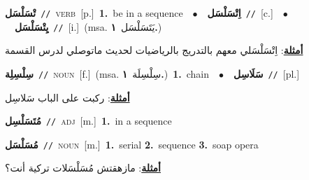 \documentclass[10pt,a4paper,twoside]{article} %
\begin{document}
\begin{multicols}{2}
{\setlength\topsep{0pt}\textbf{\foreignlanguage{arabic}{تْسَلْسَل}}\ {\color{gray}\texttt{//}\color{black}}\ \textsc{verb}\ [p.]\ \textbf{1.}~be in a sequence\ \ $\bullet$\ \ \setlength\topsep{0pt}\textbf{\foreignlanguage{arabic}{اِتْسَلْسَل}}\ {\color{gray}\texttt{//}\color{black}}\ [c.]\ \ $\bullet$\ \ \setlength\topsep{0pt}\textbf{\foreignlanguage{arabic}{يِتْسَلْسَل}}\ {\color{gray}\texttt{//}\color{black}}\ [i.]\ \color{gray}(msa. \foreignlanguage{arabic}{يَتَسَلْسَل}~\foreignlanguage{arabic}{\textbf{١.}})\color{black}\  \begin{flushright}\color{gray}\foreignlanguage{arabic}{\textbf{\underline{\foreignlanguage{arabic}{أمثلة}}}: اِتْسَلْسَلي معهم بالتدريج بالرياضيات لحديث ماتوصلي لدرس القسمة}\end{flushright}\color{black}} \vspace{2mm}

{\setlength\topsep{0pt}\textbf{\foreignlanguage{arabic}{سِلْسِلِة}}\ {\color{gray}\texttt{//}\color{black}}\ \textsc{noun}\ [f.]\ \color{gray}(msa. \foreignlanguage{arabic}{سِلْسِلَة}~\foreignlanguage{arabic}{\textbf{١.}})\color{black}\ \textbf{1.}~chain\ \ $\bullet$\ \ \setlength\topsep{0pt}\textbf{\foreignlanguage{arabic}{سَلَاسِل}}\ {\color{gray}\texttt{//}\color{black}}\ [pl.]\  \begin{flushright}\color{gray}\foreignlanguage{arabic}{\textbf{\underline{\foreignlanguage{arabic}{أمثلة}}}: ركبت على الباب سَلاسِل}\end{flushright}\color{black}} \vspace{2mm}

{\setlength\topsep{0pt}\textbf{\foreignlanguage{arabic}{مُتَسَلْسِل}}\ {\color{gray}\texttt{//}\color{black}}\ \textsc{adj}\ [m.]\ \textbf{1.}~in a sequence\ } \vspace{2mm}

{\setlength\topsep{0pt}\textbf{\foreignlanguage{arabic}{مُسَلْسَل}}\ {\color{gray}\texttt{//}\color{black}}\ \textsc{noun}\ [m.]\ \textbf{1.}~serial  \textbf{2.}~sequence  \textbf{3.}~soap opera\  \begin{flushright}\color{gray}\foreignlanguage{arabic}{\textbf{\underline{\foreignlanguage{arabic}{أمثلة}}}: مازهقتش مُسَلْسَلات تركية أنت؟}\end{flushright}\color{black}} \vspace{2mm}


\end{multicols}
\end{document}
